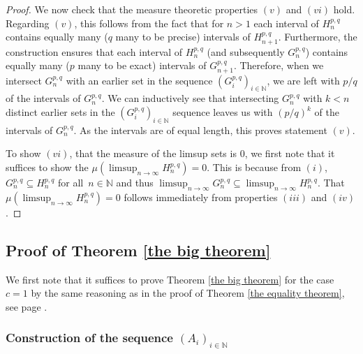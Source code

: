 \documentclass[12pt]{article}
\begin{document}
\begin{proof}
    We now check that the measure theoretic properties $(v)$ and $(vi)$ hold. Regarding $(v)$, this follows from the fact that for $n>1$ each interval of $H_n^{p,q}$ contains equally many ($q$ many to be precise) intervals of $H_{n+1}^{p,q}$. Furthermore, the construction ensures that each interval of $H_n^{p,q}$ (and subsequently $G_n^{p,q}$) contains equally many ($p$ many to be exact) intervals of $G_{n+1}^{p,q}$. Therefore, when we intersect $G_n^{p,q}$ with an earlier set in the sequence $(G_i^{p,q})_{i \in \mathbb{N}}$, we are left with $p/q$ of the intervals of $G_n^{p,q}$. We can inductively see that intersecting $G_n^{p,q}$ with $k < n$ distinct earlier sets in the $(G_i^{p,q})_{i \in \mathbb{N}}$ sequence leaves us with $(p/q)^k$ of the intervals of $G_n^{p,q}$. As the intervals are of equal length, this proves statement $(v)$.

To show $(vi)$, that the measure of the limsup sets is $0$, we first note that it suffices to show the $\mu\left(\limsup_{n \rightarrow \infty} H_{n}^{p,q}\right)=0$. This is because from $(i)$, $G_n^{p,q} \subseteq H_n^{p,q}$ for all~$n \in \mathbb{N}$ and thus $\limsup_{n \rightarrow \infty} G_n^{p,q} \subseteq \limsup_{n \rightarrow \infty} H_n^{p,q}$. That $\mu(\limsup_{n \rightarrow \infty} H_n^{p,q})=0 $ follows immediately from properties $(iii)$ and $(iv)$. \qedhere


\end{proof}


\subsection{Proof of Theorem \ref{the big theorem}}

We first note that it suffices to prove Theorem \ref{the big theorem} for the case $c=1$ by the same reasoning as in the proof of Theorem \ref{the equality theorem}, see page \pageref{c argument}.
\subsubsection{Construction of the sequence \texorpdfstring{$(A_i)_{i \in \mathbb{N}}$}{Ai}}
\end{document}
